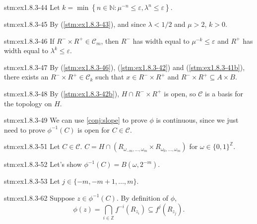 \begin{statement}{stm:ex1.8.3-44}
Let $k = \min \left\{ n \in \mathbb{N} : \mu^{-n} \leq \varepsilon, \lambda^n \leq \varepsilon \right\}$.
\end{statement}

\begin{statement}{stm:ex1.8.3-45}
By (\ref{stm:ex1.8.3-43}), and since $\lambda < 1/2$ and $\mu > 2$, $k > 0$.
\end{statement}

\begin{statement}{stm:ex1.8.3-46}
If $R^- \times R^+ \in \mathcal{C}_m$, then $R^-$ has width equal to $\mu^{-k} \leq \varepsilon$ and $R^+$ has width equal to $\lambda^k \leq \varepsilon$.
\end{statement}

\begin{statement}{stm:ex1.8.3-47}
By (\ref{stm:ex1.8.3-46}), (\ref{stm:ex1.8.3-42}) and (\ref{stm:ex1.8.3-41b}), there exists an $R^- \times R^+ \in \mathcal{C}_k$ such that $x \in R^- \times R^+$ and $R^- \times R^+ \subseteq A \times B$.
\end{statement}

\begin{statement}{stm:ex1.8.3-48}
By (\ref{stm:ex1.8.3-42b}), $H \cap R^- \times R^+$ is open, so $\mathcal{C}$ is a basis for the topology on $H$.
\end{statement}

\begin{explanation}{stm:ex1.8.3-49}
We can use \ref{conj:slope} to prove $\phi$ is continuous, since we just need to prove $\phi^{-1}(C)$ is open for $C \in \mathcal{C}$.
\end{explanation}

\begin{statement}{stm:ex1.8.3-51}
Let $C \in \mathcal{C}$. $C = H \cap (R_{\omega_{-m}, \ldots, \omega_m} \times R_{\omega_0, \ldots, \omega_m})$ for $\omega \in \{0,1\}^{\mathbb{Z}}$.
\end{statement}

\begin{explanation}{stm:ex1.8.3-52}
Let's show $\phi^{-1}(C) = B(\omega, 2^{-m})$.
\end{explanation}

\begin{statement}{stm:ex1.8.3-53}
Let $j \in \{-m, -m+1, \ldots, m\}$.
\end{statement}

\begin{statement}{stm:ex1.8.3-62}
Suppose $z \in \phi^{-1}(C)$. By definition of $\phi$,
\[
\phi(z) = \bigcap_{i \in \mathbb{Z}} f^{-i}(R_{z_i}) \subseteq f^j(R_{z_j}).
\]
\end{statement}


